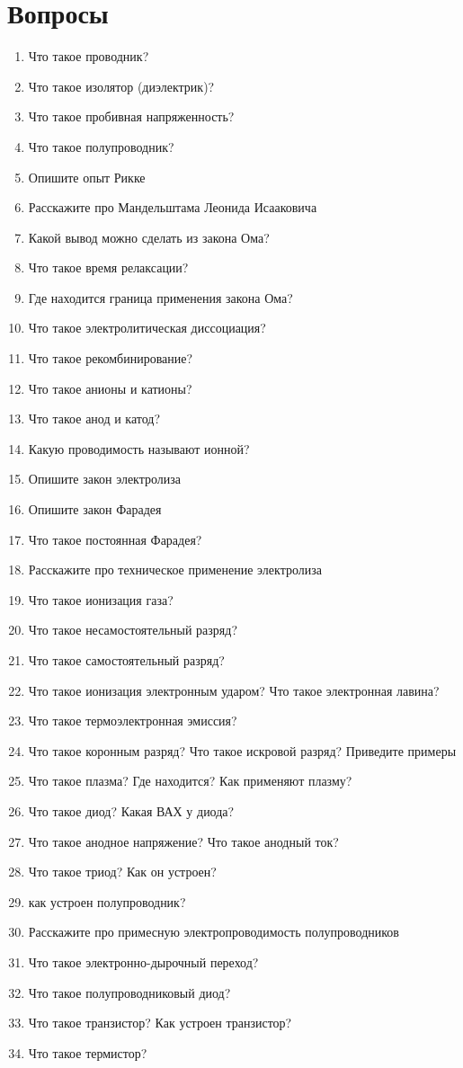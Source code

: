 \documentclass[12pt,a4paper]{report}
\begin{document}
\section{Вопросы}
\begin{enumerate}
\item Что такое проводник?
\item Что такое изолятор (диэлектрик)?
\item Что такое пробивная напряженность?
\item Что такое полупроводник?
\item Опишите опыт Рикке
\item Расскажите про Мандельштама Леонида Исааковича
\item Какой вывод можно сделать из закона Ома?
\item Что такое время релаксации?
\item Где находится граница применения закона Ома?
\item Что такое электролитическая диссоциация?
\item Что такое рекомбинирование?
\item Что такое анионы и катионы?
\item Что такое анод и катод?
\item Какую проводимость называют ионной?
\item Опишите закон электролиза
\item Опишите закон Фарадея
\item Что такое постоянная Фарадея?
\item Расскажите про техническое применение электролиза
\item Что такое ионизация газа?
\item Что такое несамостоятельный разряд?
\item Что такое самостоятельный разряд?
\item Что такое ионизация электронным ударом? Что такое электронная лавина?
\item Что такое термоэлектронная эмиссия?
\item Что такое коронным разряд? Что такое искровой разряд? Приведите примеры
\item Что такое плазма? Где находится? Как применяют плазму?
\item Что такое диод? Какая ВАХ у диода?
\item Что такое анодное напряжение? Что такое анодный ток?
\item Что такое триод? Как он устроен?
\item как устроен полупроводник?
\item Расскажите про примесную электропроводимость полупроводников
\item Что такое электронно-дырочный переход?
\item Что такое полупроводниковый диод?
\item Что такое транзистор? Как устроен транзистор?
\item Что такое термистор?
\end{enumerate}
\end{document}
